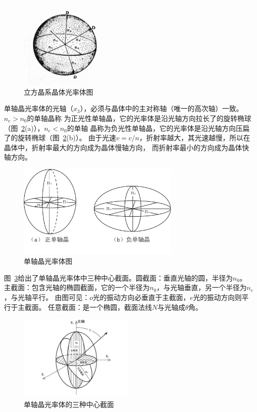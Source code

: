\documentclass[11pt,a4paper]{article}
\begin{document}
\begin{spacing}{1.3}
\begin{CJK*}{UTF8}{gbsn}
\begin{figure}
\centering
\includegraphics[width=0.4\textwidth]{fig4-1-1}
\caption{立方晶系晶体光率体图}
\label{fig:4-1-1}
\end{figure}
单轴晶光率体的光轴（$x_3$），必须与晶体中的主对称轴（唯一的高次轴）一致。$n_e>n_0$的单轴晶称
为正光性单轴晶，它的光率体是沿光轴方向拉长了的旋转椭球（图~\ref{fig:4-1-2}(a)），$n_e<n_0$的单轴
晶称为负光性单轴晶，它的光率体是沿光轴方向压扁了的旋转椭球（图~\ref{fig:4-1-2}(b)）。
由于光速$v=c/n$，折射率越大，其光速越慢，所以在晶体中，折射率最大的方向成为晶体慢轴方向，
而折射率最小的方向成为晶体快轴方向。\par
\begin{figure}
\centering
\includegraphics[width=0.7\textwidth]{fig4-1-2}
\caption{单轴晶光率体图}
\label{fig:4-1-2}
\end{figure}
图~\ref{fig:4-1-3}给出了单轴晶光率体中三种中心截面。圆截面：垂直光轴的圆，半径为$n_0$。
主截面：包含光轴的椭圆截面，它的一个半径为$n_0$，与光轴垂直，另一个半径为$n_e$，与光轴平行。
由图可见：$o$光的振动方向必垂直于主截面，$e$光的振动方向则平行于主截面。
任意截面：是一个椭圆，截面法线$N$与光轴成$\theta$角。
\begin{figure}
\centering
\includegraphics[width=0.5\textwidth]{fig4-1-3}
\caption{单轴晶光率体的三种中心截面}
\label{fig:4-1-3}
\end{figure}

\end{CJK*}
\end{spacing}
\end{document}
